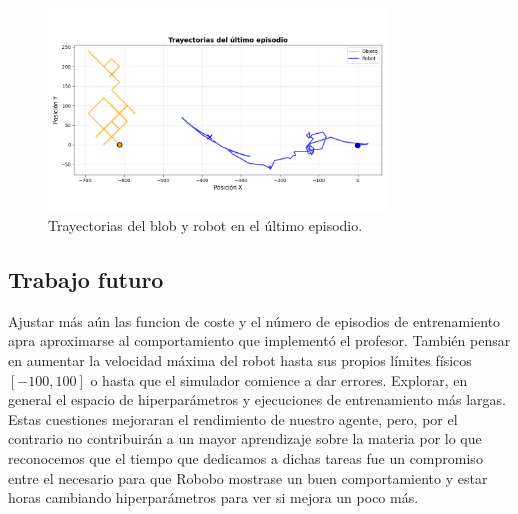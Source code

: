 \documentclass[12pt,a4paper]{article}
\begin{document}
\begin{figure}[h]
    \centering
    \includegraphics[width=0.8\textwidth]{Figure_12.png}
    \caption{Trayectorias del blob y robot en el último episodio.}
    \label{fig:etiqueta2}
\end{figure}

\subsection{Trabajo futuro}

Ajustar más aún las funcion de coste y el número  de episodios de entrenamiento
apra aproximarse al comportamiento que implementó el profesor. También pensar en
aumentar la velocidad máxima del robot hasta sus propios límites físicos
$[-100,100]$ o hasta que el simulador comience a dar errores.
Explorar, en general el espacio de hiperparámetros y ejecuciones de entrenamiento más largas. Estas cuestiones mejoraran el rendimiento de nuestro agente, pero, por el contrario no contribuirán a un mayor aprendizaje sobre la materia por lo que reconocemos que el tiempo que dedicamos a dichas tareas fue un compromiso entre el necesario para que Robobo mostrase un buen comportamiento y estar horas cambiando hiperparámetros para ver si mejora un poco más. 
\end{document}

